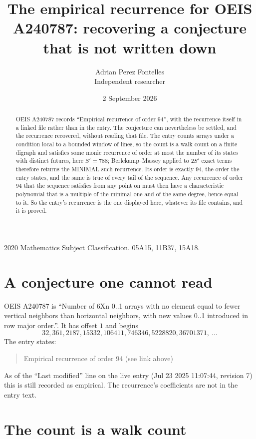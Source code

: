 \documentclass[11pt,a4paper]{article}
\title{The empirical recurrence for OEIS A240787: recovering a conjecture that is not written down}
\author{Adrian Perez Fontelles\\ \small Independent researcher}
\date{2 September 2026}
\theoremstyle{plain}
\theoremstyle{definition}
\begin{document}
\maketitle

\begin{abstract}
OEIS A240787 records ``Empirical recurrence of order $94$'', with the recurrence itself in a
linked file rather than in the entry. The conjecture can nevertheless be settled, and the
recurrence recovered, without reading that file. The entry counts arrays under a condition
local to a bounded window of lines, so the count is a walk count on a finite digraph and
satisfies some monic recurrence of order at most the number of its states with distinct
futures, here $S'=788$; Berlekamp--Massey applied to $2S'$ exact
terms therefore returns the MINIMAL such recurrence. Its order is exactly $94$, the order
the entry states, and the same is true of every tail of the sequence. Any recurrence of order
$94$ that the sequence satisfies from any point on must then have a characteristic
polynomial that is a multiple of the minimal one and of the same degree, hence equal to it. So
the entry's recurrence is the one displayed here, whatever its file contains, and it is
proved.
\end{abstract}

\noindent\small 2020 Mathematics Subject Classification. 05A15, 11B37, 15A18.\normalsize

\section{A conjecture one cannot read}

OEIS A240787 is ``Number of 6Xn 0..1 arrays with no element equal to fewer vertical neighbors than horizontal neighbors, with new values 0..1 introduced in row major order.''. It has offset $1$ and begins
\[
32, 361, 2187, 15332, 106411, 746346, 5228820, 36701371,\ \dots
\]
The entry states:
\begin{quote}
Empirical recurrence of order 94 (see link above)
\end{quote}
As of the ``Last modified'' line on the live entry (Jul 23 2025 11:07:44, revision 7) this is still
recorded as empirical. The recurrence's coefficients are not in the entry text.

\section{The count is a walk count}
\end{document}
